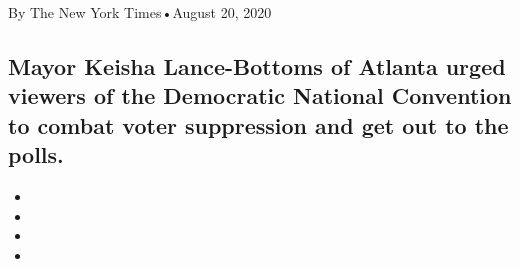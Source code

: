 By The New York Times•August 20, 2020

\hypertarget{mayor-keisha-lance-bottoms-of-atlanta-urged-viewers-of-the-democratic-national-convention-to-combat-voter-suppression-and-get-out-to-the-polls-1}{%
\subsection{Mayor Keisha Lance-Bottoms of Atlanta urged viewers of the
Democratic National Convention to combat voter suppression and get out
to the
polls.}\label{mayor-keisha-lance-bottoms-of-atlanta-urged-viewers-of-the-democratic-national-convention-to-combat-voter-suppression-and-get-out-to-the-polls-1}}

\begin{itemize}
\item
\item
\item
\item
\end{itemize}

